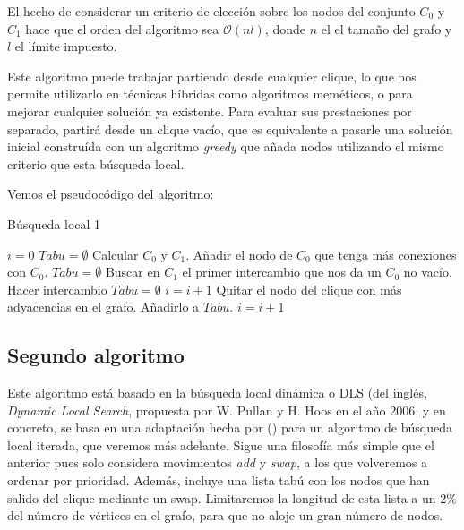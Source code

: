 El hecho de considerar un criterio de elección sobre los nodos del conjunto $C_0$ y $C_1$ hace que
el orden del algoritmo sea $\mathcal{O}(nl)$, donde $n$ el el tamaño del grafo y $l$ el límite impuesto.

Este algoritmo puede trabajar partiendo desde cualquier clique, lo que nos permite utilizarlo en técnicas
híbridas como algoritmos meméticos, o para mejorar cualquier solución ya existente. Para evaluar
sus prestaciones por separado, partirá desde un clique vacío, que es equivalente a pasarle una solución
inicial construída con un algoritmo \textit{greedy} que añada nodos utilizando el mismo criterio que esta
búsqueda local.

Vemos el pseudocódigo del algoritmo:

\begin{algorithm}[H]
\caption{Búsqueda local 1}
  \begin{algorithmic}
    \State $i = 0$
    \State $Tabu = \emptyset$
    \State Calcular $C_0$ y $C_1$.
    \Repeat
        \State Añadir el nodo de $C_0$ que tenga más conexiones con $C_0$.
        \State $Tabu = \emptyset$
      \Else
        \State Buscar en $C_1$ el primer intercambio que nos da un $C_0$ no vacío.
          \State Hacer intercambio
          \State $Tabu = \emptyset$
          \State $i = i + 1$
        \Else
          \State Quitar el nodo del clique con más adyacencias en el grafo.
          \State Añadirlo a $Tabu$.
          \State $i = i + 1$
        \EndIf
      \EndIf
  \end{algorithmic}
\end{algorithm}

\subsection{Segundo algoritmo}

Este algoritmo está basado en la búsqueda local dinámica o DLS (del inglés, \textit{Dynamic Local Search},
propuesta por W. Pullan y H. Hoos en el año 2006, y en concreto, se basa en una adaptación hecha
por () para un algoritmo de búsqueda local iterada, que veremos más adelante.
Sigue una filosofía más simple que el anterior pues solo considera movimientos \textit{add}
y \textit{swap}, a los que volveremos a ordenar por prioridad. Además, incluye una lista
tabú con los nodos que han salido del clique mediante un swap. Limitaremos la longitud de esta
lista a un 2\% del número de vértices en el grafo, para que no aloje un gran número de nodos.

